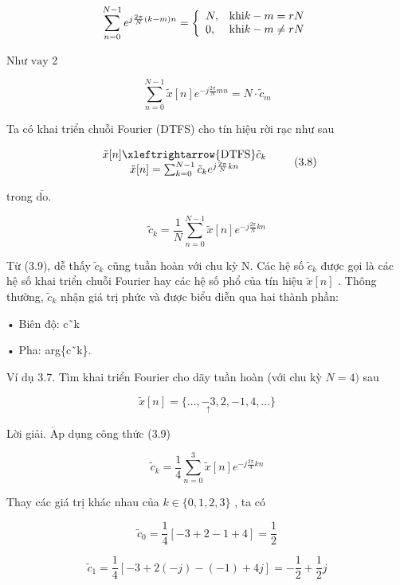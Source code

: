 \documentclass[
  10
]{article}
\begin{document}
\[
\sum_ {n = 0} ^ {N - 1} e ^ {j \frac {2 \pi}{N} (k - m) n} = \left\{ \begin{array}{l l} N, & \mathrm{khi} k - m = r N \\ 0, & \mathrm{khi} k - m \neq r N \end{array} \right.
\]

Như \(\mathrm { v a y }\) 2

\[
\sum_ {n = 0} ^ {N - 1} \tilde {x} [ n ] e ^ {- j \frac {2 \pi}{N} m n} = N \cdot \tilde {c} _ {m}
\]

Ta có khai triển chuỗi Fourier (DTFS) cho tín hiệu rời rạc như sau

\[
\begin{array}{c} \tilde {x} [ n ] \xleftrightarrow {\mathrm{DTFS}} \tilde {c} _ {k} \\ \tilde {x} [ n ] = \sum_ {k = 0} ^ {N - 1} \tilde {c} _ {k} e ^ {j \frac {2 \pi}{N} k n} \end{array}\tag{3.8}
\]

trong \(\mathrm { \bar { d o } } .\)

\[
\tilde {c} _ {k} = \frac {1}{N} \sum_ {n = 0} ^ {N - 1} \tilde {x} [ n ] e ^ {- j \frac {2 \pi}{N} k n}\tag{3.9}
\]

Từ (3.9), dễ thấy \(\tilde { c } _ { k }\) cũng tuần hoàn với chu kỳ N.
Các hệ số \(\tilde { c } _ { k }\) được gọi là các hệ số khai triển
chuỗi Fourier hay các hệ số phổ của tín hiệu \({ \tilde { x } } [ n ]\)
. Thông thường, \(\tilde { c } _ { k }\) nhận giá trị phức và được biểu
diễn qua hai thành phần:

• Biên độ: \textbar{}c˜k\textbar{}

• Pha: arg\{c˜k\}.

Ví dụ 3.7. Tìm khai triển Fourier cho dãy tuần hoàn (với chu kỳ
\(N = 4 )\) sau

\[
\tilde {x} [ n ] = \{\ldots , \underset {\uparrow} {- 3}, 2, - 1, 4, \ldots \}
\]

Lời giải. \(\mathrm { { \acute { A } p } }\) dụng công thức (3.9)

\[
\tilde {c} _ {k} = \frac {1}{4} \sum_ {n = 0} ^ {3} \tilde {x} [ n ] e ^ {- j \frac {2 \pi}{4} k n}
\]

Thay các giá trị khác nhau của \(k \in \{ 0 , 1 , 2 , 3 \}\) , ta có

\[
\tilde {c} _ {0} = \frac {1}{4} [ - 3 + 2 - 1 + 4 ] = \frac {1}{2}
\]

\[
\tilde {c} _ {1} = \frac {1}{4} [ - 3 + 2 (- j) - (- 1) + 4 j ] = - \frac {1}{2} + \frac {1}{2} j
\]
\end{document}
